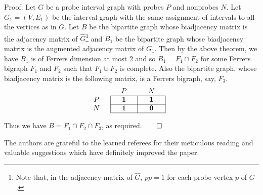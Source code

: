 \documentclass[secthm]{elsart}
\begin{document}
\begin{pf*}{Proof.}
Let $G$ be a probe interval graph with probes $P$ and nonprobes $N$. Let $G_1=(V,E_1)$ be the interval graph with the same assignment of intervals to all the vertices as in $G$. Let $B$ be the bipartite graph whose biadjacency matrix is the adjacency matrix of $\widehat{G}$\footnote{Note that, in the adjacency matrix of $\widehat{G}$, $pp=1$ for each probe vertex $p$ of $G$.} and $B_1$ be the bipartite graph whose biadjacency matrix is the augmented adjacency matrix of $G_1$. Then by the above theorem, we have $B_1$ is of Ferrers dimension at most $2$ and so $B_1=F_1\cap F_2$ for some Ferrers bigraph $F_1$ and $F_2$ such that $F_1\cup F_2$ is complete. Also the bipartite graph, whose biadjacency matrix is the following matrix, is a Ferrers bigraph, say, $F_3$.
$$\begin{array}{cc|ccc|ccc|c}
\multicolumn{3}{c}{} & P & \multicolumn{2}{c}{} &N& \multicolumn{2}{c}{}\\ \cline{3-8}
P &&& \mathbf{1} &&& \mathbf{1} &&\\ \cline{3-8}
N &&& \mathbf{1} &&& \mathbf{0} &&\\ \cline{3-8}
\end{array}$$

Thus we have $B=F_1\cap F_2\cap F_3$, as required.\hfill $\qed$
\end{pf*}

\begin{ack}
The authors are grateful to the learned referees for their meticulous reading and valuable suggestions which have definitely improved the paper.
\end{ack}
\end{document}
